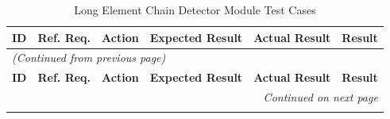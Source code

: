 \documentclass[12pt, titlepage]{article}
\begin{document}
\begin{longtable}{c
    >{\raggedright\arraybackslash}p{1.5cm}
    >{\raggedright\arraybackslash}p{4.5cm}
    >{\raggedright\arraybackslash}p{4cm}
  >{\raggedright\arraybackslash}p{3cm} c}
  \toprule
  \textbf{ID} & \textbf{Ref. Req.} & \textbf{Action} &
  \textbf{Expected Result} & \textbf{Actual Result} & \textbf{Result} \\
  \midrule
  \endfirsthead

  \multicolumn{6}{l}{\textit{(Continued from previous page)}} \\
  \toprule
  \textbf{ID} & \textbf{Ref. Req.} & \textbf{Action} &
  \textbf{Expected Result} & \textbf{Actual Result} & \textbf{Result} \\
  \midrule
  \endhead

  \multicolumn{6}{r}{\textit{Continued on next page}} \\
  \endfoot

  \bottomrule
  \caption{Long Element Chain Detector Module Test Cases}
  \label{table:lec_tests}
  \endlastfoot


\end{longtable}
\end{document}
